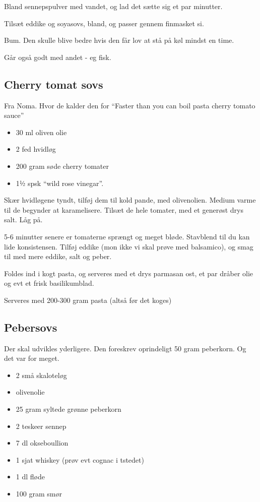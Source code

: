 \documentclass[
]{book}
\providecommand{\tightlist}{%
  \setlength{\itemsep}{0pt}\setlength{\parskip}{0pt}}
\begin{document}
Bland sennepspulver med vandet, og lad det sætte sig et par minutter.

Tilsæt eddike og soyasovs, bland, og passer gennem finmasket si.

Bum. Den skulle blive bedre hvis den får lov at stå på køl mindst en time.

Går også godt med andet - eg fisk.

\subsection{Cherry tomat sovs}\label{cherry-tomat-sovs}

Fra Noma. Hvor de kalder den for ``Faster than you can boil pasta cherry tomato sauce''

\begin{itemize}
\tightlist
\item
  30 ml oliven olie
\item
  2 fed hvidløg
\item
  200 gram søde cherry tomater
\item
  1½ spsk ``wild rose vinegar''.
\end{itemize}

Skær hvidløgene tyndt, tilføj dem til kold pande, med olivenolien.
Medium varme til de begynder at karamelisere.
Tilsæt de hele tomater, med et generøst drys salt. Låg på.

5-6 minutter senere er tomaterne sprængt og meget bløde. Stavblend til du kan lide konsistensen. Tilføj
eddike (mon ikke vi skal prøve med balsamico), og smag til med mere eddike, salt og peber.

Foldes ind i kogt pasta, og serveres med et drys parmasan ost, et par dråber olie og evt et frisk basilikumblad.

Serveres med 200-300 gram pasta (altså før det koges)

\subsection{Pebersovs}\label{pebersovs}

Der skal udvikles yderligere.
Den foreskrev oprindeligt 50 gram peberkorn. Og det var for meget.

\begin{itemize}
\tightlist
\item
  2 små skaloteløg
\item
  olivenolie
\item
  25 gram syltede grønne peberkorn
\item
  2 teskeer sennep
\item
  7 dl okseboullion
\item
  1 sjat whiskey (prøv evt cognac i tstedet)
\item
  1 dl fløde
\item
  100 gram smør
\end{itemize}
\end{document}
